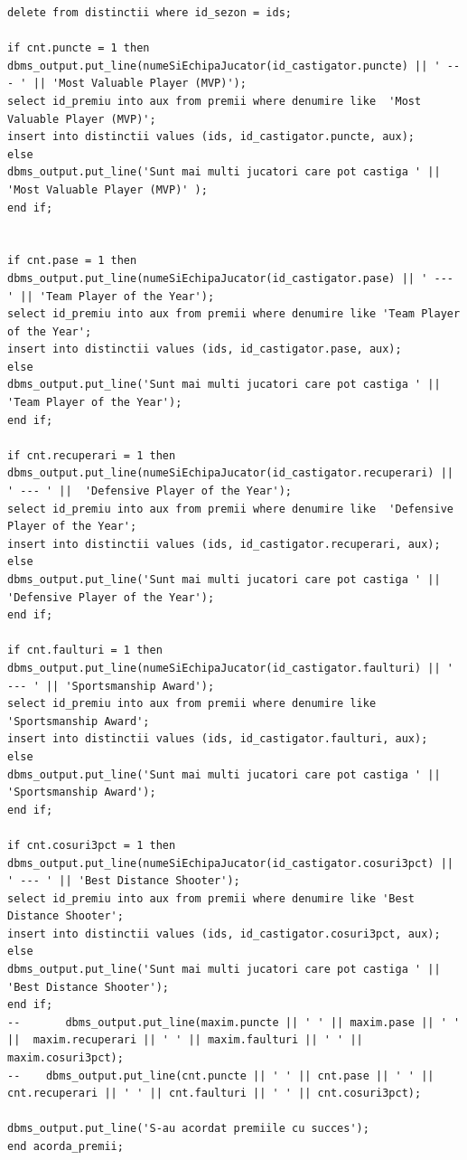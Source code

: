 \documentclass{article}
\begin{document}
\begin{multicols}{2}
\begin{lstlisting}
delete from distinctii where id_sezon = ids;

if cnt.puncte = 1 then
dbms_output.put_line(numeSiEchipaJucator(id_castigator.puncte) || ' --- ' || 'Most Valuable Player (MVP)');
select id_premiu into aux from premii where denumire like  'Most Valuable Player (MVP)';
insert into distinctii values (ids, id_castigator.puncte, aux);
else
dbms_output.put_line('Sunt mai multi jucatori care pot castiga ' || 'Most Valuable Player (MVP)' );
end if;


if cnt.pase = 1 then
dbms_output.put_line(numeSiEchipaJucator(id_castigator.pase) || ' --- ' || 'Team Player of the Year');
select id_premiu into aux from premii where denumire like 'Team Player of the Year';
insert into distinctii values (ids, id_castigator.pase, aux);
else
dbms_output.put_line('Sunt mai multi jucatori care pot castiga ' || 'Team Player of the Year');
end if;       

if cnt.recuperari = 1 then
dbms_output.put_line(numeSiEchipaJucator(id_castigator.recuperari) || ' --- ' ||  'Defensive Player of the Year');
select id_premiu into aux from premii where denumire like  'Defensive Player of the Year';
insert into distinctii values (ids, id_castigator.recuperari, aux);
else
dbms_output.put_line('Sunt mai multi jucatori care pot castiga ' ||  'Defensive Player of the Year');
end if;

if cnt.faulturi = 1 then
dbms_output.put_line(numeSiEchipaJucator(id_castigator.faulturi) || ' --- ' || 'Sportsmanship Award');
select id_premiu into aux from premii where denumire like  'Sportsmanship Award';
insert into distinctii values (ids, id_castigator.faulturi, aux);
else
dbms_output.put_line('Sunt mai multi jucatori care pot castiga ' || 'Sportsmanship Award');
end if;

if cnt.cosuri3pct = 1 then
dbms_output.put_line(numeSiEchipaJucator(id_castigator.cosuri3pct) || ' --- ' || 'Best Distance Shooter');
select id_premiu into aux from premii where denumire like 'Best Distance Shooter';
insert into distinctii values (ids, id_castigator.cosuri3pct, aux);
else
dbms_output.put_line('Sunt mai multi jucatori care pot castiga ' || 'Best Distance Shooter');
end if;
--       dbms_output.put_line(maxim.puncte || ' ' || maxim.pase || ' ' ||  maxim.recuperari || ' ' || maxim.faulturi || ' ' || maxim.cosuri3pct);
--    dbms_output.put_line(cnt.puncte || ' ' || cnt.pase || ' ' ||  cnt.recuperari || ' ' || cnt.faulturi || ' ' || cnt.cosuri3pct);

dbms_output.put_line('S-au acordat premiile cu succes');
end acorda_premii;


\end{lstlisting}
\end{multicols}
\end{document}
